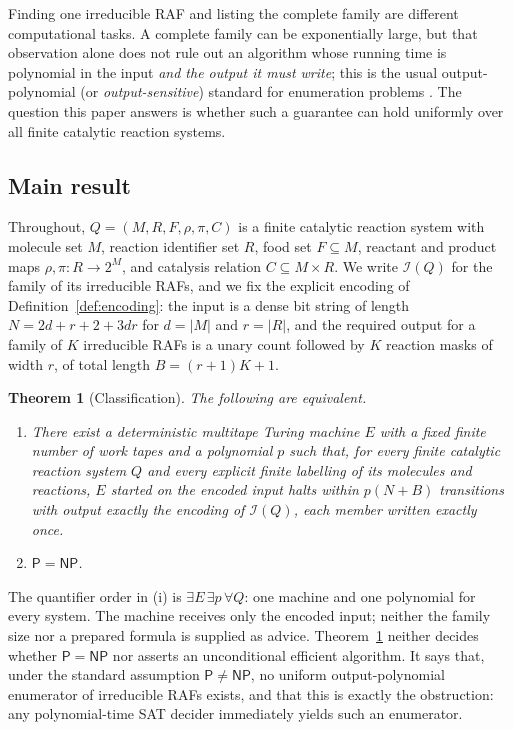 \documentclass[11pt,a4paper]{article}
\theoremstyle{plain}
\newtheorem{theorem}{Theorem}[section]
\theoremstyle{definition}
\theoremstyle{remark}
\newcommand{\Irr}{\mathcal I}
\newcommand{\PP}{\mathsf P}
\newcommand{\NP}{\mathsf{NP}}
\begin{document}
Finding one irreducible RAF and listing the complete family are different computational tasks. A complete family can be exponentially large, but that observation alone does not rule out an algorithm whose running time is polynomial in the input \emph{and the output it must write}; this is the usual output-polynomial (or \emph{output-sensitive}) standard for enumeration problems \cite{johnson1988generating,strozecki2023enumeration}. The question this paper answers is whether such a guarantee can hold uniformly over all finite catalytic reaction systems.

\subsection{Main result}

Throughout, $Q=(M,R,F,\rho,\pi,C)$ is a finite catalytic reaction system with molecule set $M$, reaction identifier set $R$, food set $F\subseteq M$, reactant and product maps $\rho,\pi\colon R\to 2^M$, and catalysis relation $C\subseteq M\times R$. We write $\Irr(Q)$ for the family of its irreducible RAFs, and we fix the explicit encoding of Definition~\ref{def:encoding}: the input is a dense bit string of length $N=2d+r+2+3dr$ for $d=|M|$ and $r=|R|$, and the required output for a family of $K$ irreducible RAFs is a unary count followed by $K$ reaction masks of width $r$, of total length $B=(r+1)K+1$.

\begin{theorem}[Classification]\label{thm:main}
The following are equivalent.
\begin{enumerate}[label=\textup{(\roman*)}]
\item There exist a deterministic multitape Turing machine $E$ with a fixed finite number of work tapes and a polynomial $p$ such that, for every finite catalytic reaction system $Q$ and every explicit finite labelling of its molecules and reactions, $E$ started on the encoded input halts within $p(N+B)$ transitions with output exactly the encoding of $\Irr(Q)$, each member written exactly once.
\item $\PP=\NP$.
\end{enumerate}
\end{theorem}

The quantifier order in (i) is $\exists E\,\exists p\,\forall Q$: one machine and one polynomial for every system. The machine receives only the encoded input; neither the family size nor a prepared formula is supplied as advice. Theorem~\ref{thm:main} neither decides whether $\PP=\NP$ nor asserts an unconditional efficient algorithm. It says that, under the standard assumption $\PP\ne\NP$, no uniform output-polynomial enumerator of irreducible RAFs exists, and that this is exactly the obstruction: any polynomial-time SAT decider immediately yields such an enumerator.
\end{document}
